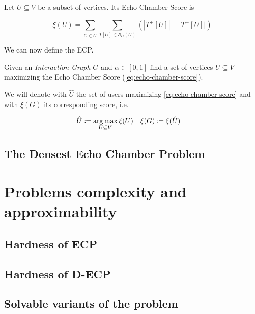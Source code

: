 \begin{definition}
	Let $U \subseteq V$ be a subset of vertices. Its Echo Chamber Score is

	\begin{equation}
		\label{eq:echo-chamber-score}
		\xi(U) = \sum^{}_{\mathcal{C} \in \mathcal{\hat{C}}} \sum^{}_{T[U] \in
		\mathcal{S} _{C} (U)} (|T^{+} [U]| - |T ^{-} [U]|)
	\end{equation}
\end{definition}

We can now define the \acrfull{ECP}.

\begin{definition}
	Given an \emph{Interaction Graph} $G$ and $\alpha \in [0, 1]$ find a set of vertices $U \subseteq
		V$ maximizing the Echo Chamber Score (\autoref{eq:echo-chamber-score}).
\end{definition}

We will denote with $\hat{U}$ the set of users maximizing
\autoref{eq:echo-chamber-score} and with $\xi(G)$ its corresponding score, i.e.

\begin{align*}
	\hat{U} & \coloneqq \operatorname*{arg\,max}_{U \subseteq V} \xi(U) & \xi(G) & \coloneqq
	\xi(\hat{U})
\end{align*}

\subsection{The Densest Echo Chamber Problem}%
\label{sub:the_densest_echo_chamber_problem}

\section{Problems complexity and approximability}%
\label{sec:problem_complexity_and_approximability}

\subsection{Hardness of ECP}%
\label{sub:ecp_is_}

\subsection{Hardness of D-ECP}%
\label{sub:ecp_is_}

\subsection{Solvable variants of the problem}%
\label{sub:solvable_variants_of_the_problem}

